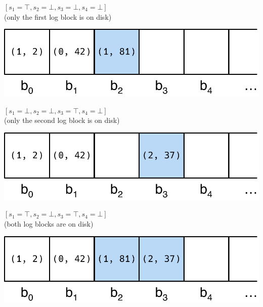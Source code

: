 \begin{example}
\begin{enumerate}[label={\raisebox{2\baselineskip}[0pt][0pt]{(\arabic*)}},ref=(\arabic*)]
\item 
\begin{minipage}[b]{0.5\textwidth}
$[s_1 = \top, s_2 = \bot, s_3 = \bot, s_4 = \bot]$\\
(only the first log block is on disk) \\
\end{minipage}\quad%
\begin{minipage}{0.4\textwidth}
\vspace{-1.2em}
\includegraphics[width=\textwidth]{figs/sec3-1.pdf}
\end{minipage}
\label{sec:problem:loststate}
\item 
\begin{minipage}[b]{0.5\textwidth}
$[s_1 = \bot, s_2 = \bot, s_3 = \top, s_4 = \bot]$\\
(only the second log block is on disk) \\
\end{minipage}\quad%
\begin{minipage}{0.4\textwidth}
\vspace{-1.2em}
\includegraphics[width=\textwidth]{figs/sec3-2.pdf}
\end{minipage}

\item 
\begin{minipage}[b]{0.5\textwidth}
$[s_1 = \top, s_2 = \bot, s_3 = \top, s_4 = \bot]$\\
(both log blocks are on disk) \\
\end{minipage}\quad%
\begin{minipage}{0.4\textwidth}
\vspace{-1.2em}
\includegraphics[width=\textwidth]{figs/sec3-3.pdf}
\end{minipage}


\end{enumerate}
\end{example}
